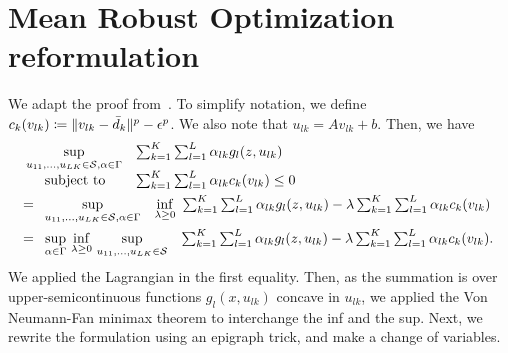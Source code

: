 \section{Mean Robust Optimization reformulation}
\fi
\label{apx:mroproof}
We adapt the proof from~\cite[Appendix A.3]{mro}. 
To simplify notation, we define $c_k(v_{lk}) \coloneqq   \|v_{lk} - \bar{d}_k \|^p - \epsilon^p$.
We also note that $u_{lk} = Av_{lk}+b$. 
Then, we have
\begin{equation*}
	\begin{aligned}
& \begin{array}[t]{ll}
	\underset{u_{11}, \dots, u_{LK} \in \mathcal{S}, \alpha \in \Gamma}{\sup} &\sum_{k=1}^K \sum_{l=1}^L \alpha_{lk} g_l(z,u_{lk}) \\
	\mbox{~~~~subject to} & \sum_{k=1} ^K \sum_{l=1}^L \alpha_{lk} c_k(v_{lk}) \le 0
\end{array}\\
&=\begin{array}[t]{ll}
	\underset{u_{11}, \dots, u_{LK} \in \mathcal{S}, \alpha \in \Gamma}{\sup} & \underset{\lambda \geq 0}{\inf}~\sum_{k=1}^K \sum_{l=1}^L \alpha_{lk}g_l(z,u_{lk}) - \lambda\sum_{k=1} ^K \sum_{l=1}^L \alpha_{lk} c_k(v_{lk})\\
\end{array}\\
&=\begin{array}[t]{ll}
	\underset{\alpha \in \Gamma}{\sup}~\underset{\lambda \geq 0}{\inf}~\underset{u_{11}, \dots, u_{LK} \in \mathcal{S}}{\sup} &\sum_{k=1}^K \sum_{l=1}^L \alpha_{lk} g_l(z,u_{lk}) - \lambda\sum_{k=1} ^K \sum_{l=1}^L \alpha_{lk} c_k(v_{lk}).\\
\end{array}\\
\end{aligned}
\end{equation*}
We applied the Lagrangian in the first equality. Then, as the summation is over upper-semicontinuous functions $g_l(x,u_{lk})$ concave in $u_{lk}$, we applied the Von Neumann-Fan minimax theorem to interchange the inf and the sup. Next, we rewrite the formulation using an epigraph trick, and make a change of variables. 
